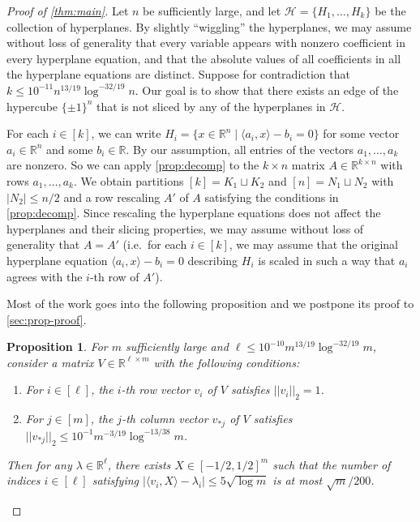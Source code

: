 \documentclass[reqno]{amsart}
\newtheorem{prop}[theorem]{Proposition}
\theoremstyle{remark}
\theoremstyle{definition}
\numberwithin{theorem}{section}
\renewcommand{\(}{\bigl(}
\renewcommand{\)}{\bigr)\vphantom{)}}
\newcommand{\cH}{\mathcal H}
\renewcommand{\le}{\leqslant}
\newcommand{\R}{\mathbb R}
\newcommand{\ang}[1]{\langle#1\rangle}
\newcommand{\bin}{\{\pm 1\}}
\begin{document}
\begin{proof}[Proof of \cref{thm:main}]
Let $n$ be sufficiently large, and let $\cH = \{H_1,\dots, H_k\}$ be the collection of hyperplanes. By slightly ``wiggling'' the hyperplanes, we may assume without loss of generality that every variable appears with nonzero coefficient in every hyperplane equation, and that the absolute values of all coefficients in all the hyperplane equations are distinct. Suppose for contradiction that $k\le 10^{-11}n^{13/19}\log^{-32/19}n$. Our goal is to show that there exists an edge of the hypercube $\bin^n$ that is not sliced by any of the hyperplanes in $\cH$. 

For each $i\in [k]$, we can write $H_i = \{x\in \R^n\mid \ang{a_i,x} - b_i = 0\}$ for some vector $a_i\in \R^n$ and some $b_i\in \R$. By our assumption, all entries of the vectors $a_1,\dots,a_k$ are nonzero. So we can apply \cref{prop:decomp} to the $k\times n$ matrix $A\in \R^{k\times n}$ with rows $a_1,\dots,a_k$. We obtain partitions $[k] = K_1\sqcup K_2$ and $[n] = N_1\sqcup N_2$ with $|N_2|\le n/2$ and a row rescaling $A'$ of $A$ satisfying the conditions in \cref{prop:decomp}. Since rescaling the hyperplane equations does not affect the hyperplanes and their slicing properties, we may assume without loss of generality that $A=A'$ (i.e.\ for each $i\in [k]$, we may assume that the original hyperplane equation $\ang{a_i,x} - b_i = 0$ describing $H_i$ is scaled in such a way that $a_i$ agrees with the $i$-th row of $A'$). 

Most of the work goes into the following proposition and we postpone its proof to \cref{sec:prop-proof}.

\begin{prop}\label{prop:construct-X}
For $m$ sufficiently large and $\ell\le 10^{-10}m^{13/19}\log^{-32/19}m$, consider a matrix $V\in \R^{\ell \times m}$ with the following conditions:
\begin{enumerate}
    \item For $i\in [\ell]$, the $i$-th row vector $v_i$ of $V$ satisfies $||v_i||_2 = 1$.
    \item For $j\in [m]$, the $j$-th column vector $v_{*j}$ of $V$ satisfies $||v_{*j}||_2\le 10^{-1}m^{-3/19}\log^{-13/38}m$.
\end{enumerate}
Then for any $\lambda\in \R^\ell$, there exists $X\in [-1/2, 1/2]^m$ such that the number of indices $i\in [\ell]$ satisfying $|\ang{v_i,X}-\lambda_i| \le 5\sqrt{\log m}$ is at most $\sqrt{m}/200$.
\end{prop}



\end{proof}
\end{document}

